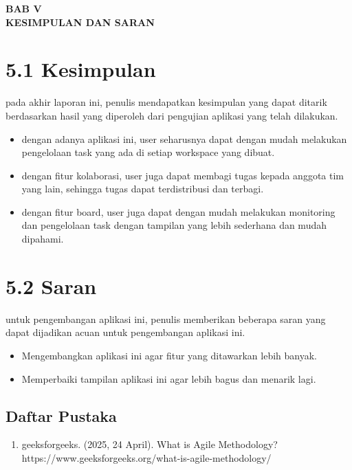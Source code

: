 \begin{center}
  \textbf{BAB V} \\[0.5em]
  \textbf{KESIMPULAN DAN SARAN}
\end{center}

\section*{5.1 Kesimpulan}
pada akhir laporan ini, penulis mendapatkan kesimpulan yang dapat ditarik berdasarkan hasil yang diperoleh dari pengujian aplikasi yang telah dilakukan.
\begin{itemize}
  \item dengan adanya aplikasi ini, user seharusnya dapat dengan mudah melakukan pengelolaan task yang ada di setiap workspace yang dibuat.
  \item dengan fitur kolaborasi, user juga dapat membagi tugas kepada anggota tim yang lain, sehingga tugas dapat terdistribusi dan terbagi.
  \item dengan fitur board, user juga dapat dengan mudah melakukan monitoring dan pengelolaan task dengan tampilan yang lebih sederhana dan mudah dipahami.
\end{itemize}



\section*{5.2 Saran}
untuk pengembangan aplikasi ini, penulis memberikan beberapa saran yang dapat dijadikan acuan untuk pengembangan aplikasi ini.
\begin{itemize}
  \item Mengembangkan aplikasi ini agar fitur yang ditawarkan lebih banyak.
  \item Memperbaiki tampilan aplikasi ini agar lebih bagus dan menarik lagi.
\end{itemize}



\pagebreak
\begin{center}
\section*{Daftar Pustaka}
\begin{enumerate}
  \item geeksforgeeks. (2025, 24 April). What is Agile Methodology? https://www.geeksforgeeks.org/what-is-agile-methodology/ 
\end{enumerate}
\end{center}

